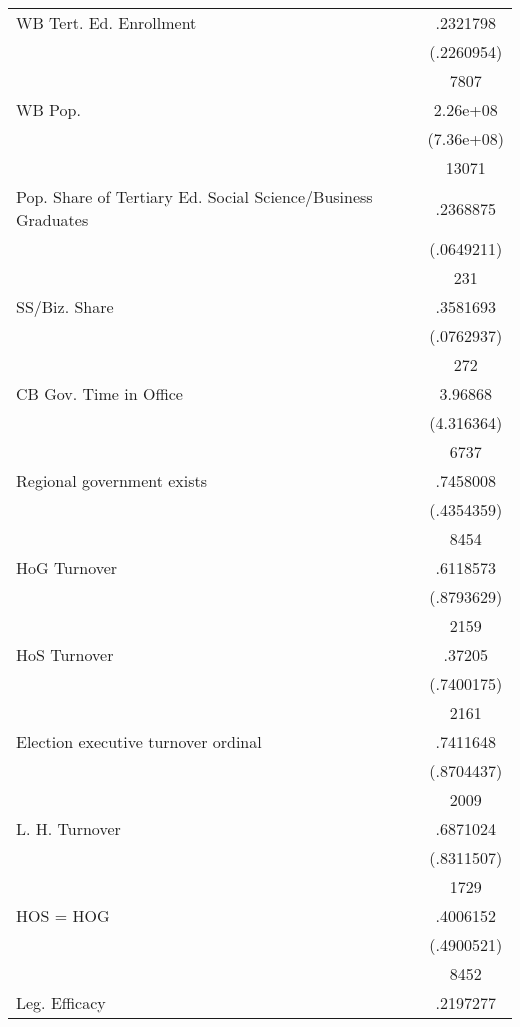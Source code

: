 {\begin{longtable}{l*{1}{c}}
WB Tert. Ed. Enrollment&    .2321798\\
                    &  (.2260954)\\
                    &        7807\\
WB Pop.             &    2.26e+08\\
                    &  (7.36e+08)\\
                    &       13071\\
Pop. Share of Tertiary Ed. Social Science/Business Graduates&    .2368875\\
                    &  (.0649211)\\
                    &         231\\
SS/Biz. Share       &    .3581693\\
                    &  (.0762937)\\
                    &         272\\
CB Gov. Time in Office&     3.96868\\
                    &  (4.316364)\\
                    &        6737\\
Regional government exists   &    .7458008\\
                    &  (.4354359)\\
                    &        8454\\
HoG Turnover        &    .6118573\\
                    &  (.8793629)\\
                    &        2159\\
HoS Turnover        &      .37205\\
                    &  (.7400175)\\
                    &        2161\\
Election executive turnover ordinal&    .7411648\\
                    &  (.8704437)\\
                    &        2009\\
L. H. Turnover      &    .6871024\\
                    &  (.8311507)\\
                    &        1729\\
HOS = HOG           &    .4006152\\
                    &  (.4900521)\\
                    &        8452\\
Leg. Efficacy       &    .2197277\\

\end{longtable}}
